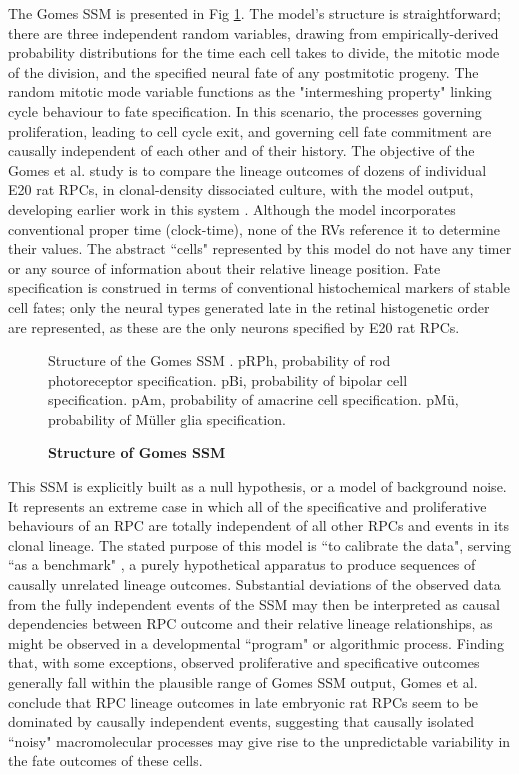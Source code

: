 The Gomes SSM is presented in Fig \ref{GomesSSM}. The model's structure is straightforward; there are three independent random variables, drawing from empirically-derived probability distributions for the time each cell takes to divide, the mitotic mode of the division, and the specified neural fate of any postmitotic progeny. The random mitotic mode variable functions as the "intermeshing property" linking cycle behaviour to fate specification. In this scenario, the processes governing proliferation, leading to cell cycle exit, and governing cell fate commitment are causally independent of each other and of their history. The objective of the Gomes et al. study is to compare the lineage outcomes of dozens of individual E20 rat RPCs, in clonal-density dissociated culture, with the model output, developing earlier work in this system \cite{Cayouette2003}. Although the model incorporates conventional proper time (clock-time), none of the RVs reference it to determine their values. The abstract ``cells" represented by this model do not have any timer or any source of information about their relative lineage position.  Fate specification is construed in terms of conventional histochemical markers of stable cell fates; only the neural types generated late in the retinal histogenetic order are represented, as these are the only neurons specified by E20 rat RPCs.
 
\begin{figure}[!h]
\caption{{\bf Structure of Gomes SSM}}
Structure of the Gomes SSM \cite{Gomes2011}. pRPh, probability of rod photoreceptor specification. pBi, probability of bipolar cell specification. pAm, probability of amacrine cell specification. pM{\"u}, probability of M{\"u}ller glia specification.
\label{GomesSSM}
\end{figure}
 
This SSM is explicitly built as a null hypothesis, or a model of background noise. It represents an extreme case in which all of the specificative and proliferative behaviours of an RPC are totally independent of all other RPCs and events in its clonal lineage. The stated purpose of this model is ``to calibrate the data", serving ``as a benchmark" \cite{Gomes2011}, a purely hypothetical apparatus to produce sequences of causally unrelated lineage outcomes. Substantial deviations of the observed data from the fully independent events of the SSM may then be interpreted as causal dependencies between RPC outcome and their relative lineage relationships, as might be observed in a developmental ``program" or algorithmic process. Finding that, with some exceptions, observed proliferative and specificative outcomes generally fall within the plausible range of Gomes SSM output, Gomes et al. conclude that RPC lineage outcomes in late embryonic rat RPCs seem to be dominated by causally independent events, suggesting that causally isolated ``noisy" macromolecular processes may give rise to the unpredictable variability in the fate outcomes of these cells. 
 
